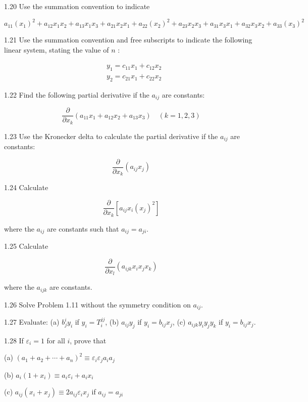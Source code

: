 \documentclass[10pt]{article}
\begin{document}
1.20 Use the summation convention to indicate

$$
a_{11}\left(x_{1}\right)^{2}+a_{12} x_{1} x_{2}+a_{13} x_{1} x_{3}+a_{21} x_{2} x_{1}+a_{22}\left(x_{2}\right)^{2}+a_{23} x_{2} x_{3}+a_{31} x_{3} x_{1}+a_{32} x_{3} x_{2}+a_{33}\left(x_{3}\right)^{2}
$$

1.21 Use the summation convention and free subscripts to indicate the following linear system, stating the value of $n$ :

$$
\begin{aligned}
& y_{1}=c_{11} x_{1}+c_{12} x_{2} \\
& y_{2}=c_{21} x_{1}+c_{22} x_{2}
\end{aligned}
$$

1.22 Find the following partial derivative if the $a_{i j}$ are constants:

$$
\frac{\partial}{\partial x_{k}}\left(a_{11} x_{1}+a_{12} x_{2}+a_{13} x_{3}\right) \quad(k=1,2,3)
$$

1.23 Use the Kronecker delta to calculate the partial derivative if the $a_{i j}$ are constants:

$$
\frac{\partial}{\partial x_{k}}\left(a_{i j} x_{j}\right)
$$

1.24 Calculate

$$
\frac{\partial}{\partial x_{k}}\left[a_{i j} x_{i}\left(x_{j}\right)^{2}\right]
$$

where the $a_{i j}$ are constants such that $a_{i j}=a_{j i}$.

1.25 Calculate

$$
\frac{\partial}{\partial x_{l}}\left(a_{i j k} x_{i} x_{j} x_{k}\right)
$$

where the $a_{i j k}$ are constants.

1.26 Solve Problem 1.11 without the symmetry condition on $a_{i j}$.

1.27 Evaluate: (a) $b_{j}^{i} y_{i}$ if $y_{i}=T_{i}^{j j}$, (b) $a_{i j} y_{j}$ if $y_{i}=b_{i j} x_{j}$, (c) $a_{i j k} y_{i} y_{j} y_{k}$ if $y_{i}=b_{i j} x_{j}$.

1.28 If $\varepsilon_{i}=1$ for all $i$, prove that

(a) $\left(a_{1}+a_{2}+\cdots+a_{n}\right)^{2} \equiv \varepsilon_{i} \varepsilon_{j} a_{i} a_{j}$

(b) $a_{i}\left(1+x_{i}\right) \equiv a_{i} \varepsilon_{i}+a_{i} x_{i}$

(c) $a_{i j}\left(x_{i}+x_{j}\right) \equiv 2 a_{i j} \varepsilon_{i} x_{j}$ if $a_{i j}=a_{j i}$
\end{document}

